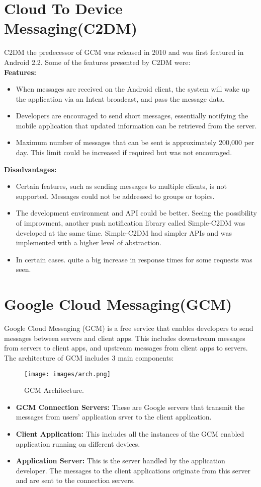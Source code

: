 \section{Cloud To Device Messaging(C2DM)}
C2DM the predecessor of GCM was released in 2010 and was first featured in Android 2.2. Some of the features presented by C2DM were:\\
\textbf{Features:}
      \begin{itemize}
      		\item When messages are received on the Android client, the
system will wake up the application via an Intent broadcast, and pass the message data.
		\item Developers are encouraged to
send short messages, essentially notifying the mobile
application that updated information can be retrieved
from the server.
		\item Maximum number of messages that can be sent is approximately 200,000 per day. This limit could be increased if required but was not encouraged.
	\end{itemize}
\textbf{Disadvantages:} 
      	\begin{itemize}
      		\item Certain features, such as sending messages to
multiple clients, is not supported. Messages could not be addressed to groups or topics.
		\item The development environment and API could be better. Seeing the possibility of improvment, another push notification library called Simple-C2DM was developed at the same time. Simple-C2DM had simpler APIs and was implemented with a higher level of abstraction.
		\item In certain cases.
quite a big increase in response times for some requests was seen.
	\end{itemize}
\section{Google Cloud Messaging(GCM)}
Google Cloud Messaging (GCM) is a free service that enables developers
to send messages between servers and client apps. This includes
downstream messages from servers to client apps, and upstream
messages from client apps to servers. The architecture of GCM includes 3 main components:
\begin{figure}
\centering
\texttt{[image: images/arch.png]}
\caption{\label{fig:arch}GCM Architecture.}
\end{figure} 
\begin{itemize}
	    \item \textbf{GCM Connection Servers: }These are Google servers that transmit the messages from users' application srver to the client application.
	    \item \textbf{Client Application: }This includes all the instances of the GCM enabled application running on different devices.
	    \item \textbf{Application Server: }This is the server handled by the application developer. The messages to the client applications originate from this server and are sent to the connection servers.
  \end{itemize}

